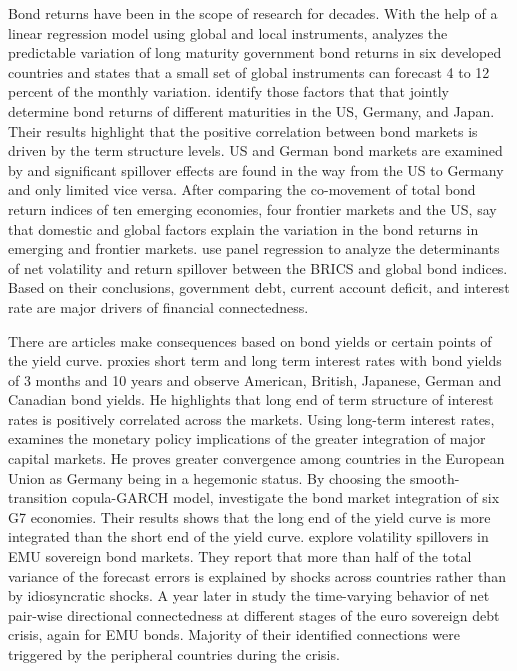 \documentclass[12pt,bibliography=totoc]{article}
\begin{document}
Bond returns have been in the scope of research for decades.
With the help of a linear regression model using global and local instruments, \cite{ilmanen1995time} analyzes the predictable variation of long maturity government bond returns in six developed countries and states that a small set of global instruments can forecast 4 to 12 percent of the monthly variation.
\cite{driessen2003common} identify those factors that that jointly determine bond returns of different maturities in the US, Germany, and Japan. Their results highlight that the positive correlation between bond markets is driven by the term structure levels.
US and German bond markets are examined by \cite{engsted2007comovement} and significant spillover effects are found in the way from the US to Germany and only limited vice versa.
After comparing the co-movement of total bond return indices of ten emerging economies, four frontier markets and the US, \cite{piljak2013bond} say that domestic and global factors explain the variation in the bond returns in emerging and frontier markets.
\cite{ahmad2018financial} use panel regression to analyze the determinants of net volatility and return spillover between the BRICS and global bond indices. Based on their conclusions, government debt, current account deficit, and interest rate are major drivers of financial connectedness.


There are articles make consequences based on bond yields or certain points of the yield curve. 
\cite{sutton2000there} proxies short term and long term interest rates with bond yields of 3 months and 10 years and observe American, British, Japanese, German and Canadian bond yields. He highlights that long end of term structure of interest rates is positively correlated across the markets.
Using long-term interest rates, \cite{laopodis2004monetary} examines the monetary policy implications of the greater integration of major capital markets. He proves greater convergence among countries in the European Union as Germany being in a hegemonic status.
By choosing the smooth-transition copula-GARCH model, \cite{kumar2011dynamics} investigate the bond market integration of six G7 economies. Their results shows that the long end of the yield curve is more integrated than the short end of the yield curve. 
\cite{fernandez2015volatility} explore volatility spillovers in EMU sovereign bond markets. They report that more than half of the total variance of the forecast errors is explained by shocks across countries rather than by idiosyncratic shocks. 
A year later in \cite{fernandez2016using} study the time-varying behavior of net pair-wise directional connectedness at different stages of the euro sovereign debt crisis, again for EMU bonds. Majority of their identified connections were triggered by the peripheral countries during the crisis.
\end{document}
